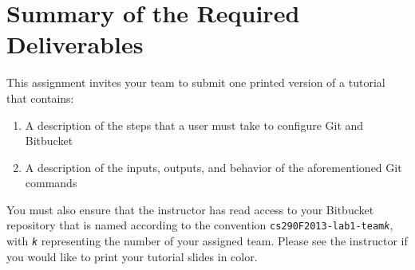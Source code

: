 \section*{Summary of the Required Deliverables}

This assignment invites your team to submit one printed version of a tutorial that contains:

\begin{enumerate}
	
	\item A description of the steps that a user must take to configure Git and Bitbucket

	\item A description of the inputs, outputs, and behavior of the aforementioned Git commands

\end{enumerate}

You must also ensure that the instructor has read access to your Bitbucket repository that is named according to the
convention {\tt cs290F2013-lab1-team{\em k}}, with {\tt {\em k}} representing the number of your assigned team. Please
see the instructor if you would like to print your tutorial slides in color.


